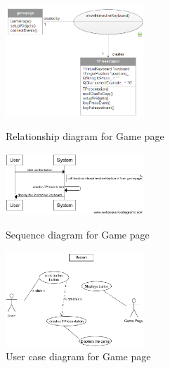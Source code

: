 \begin{figure}[h]
	\centering
	\begin{minipage}[b]{0.3\textwidth}
      \includegraphics[width=5.2cm]{diagrams/Rgamepage.png}
      \caption{Relationship diagram for Game page}   
	\end{minipage}
	\begin{minipage}[b]{0.3\textwidth}
      \includegraphics[width=5.2cm]{diagrams/Sgamepage.png}
      \caption{Sequence diagram for Game page}
	\end{minipage}
	\begin{minipage}[b]{0.3\textwidth}
      \includegraphics[width=5.2cm]{diagrams/UCgamepage.png}
      \caption{User case diagram for Game page}
	\end{minipage}
\end{figure}


